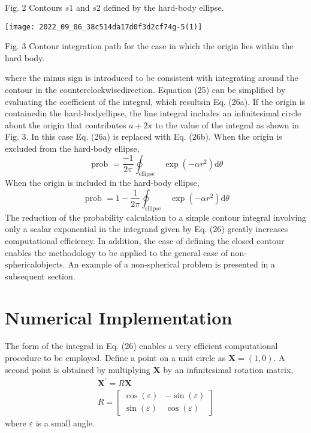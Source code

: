 \documentclass[10pt]{article}
\begin{document}
Fig. 2 Contours $s 1$ and $s 2$ defined by the hard-body ellipse.

\texttt{[image: 2022\_09\_06\_38c514da17d0f3d2cf74g-5(1)]}

Fig. 3 Contour integration path for the case in which the origin lies within the hard body.

where the minus sign is introduced to be consistent with integrating around the contour in the counterclockwisedirection. Equation (25) can be simplified by evaluating the coefficient of the integral, which resultsin Eq. (26a). If the origin is containedin the hard-bodyellipse, the line integral includes an infinitesimal circle about the origin that contributes $a+2 \pi$ to the value of the integral as shown in Fig. 3. In this case Eq. (26a) is replaced with Eq. (26b). When the origin is excluded from the hard-body ellipse,
$$
\text { prob }=\frac{-1}{2 \pi} \oint_{\text {ellipse }} \exp \left(-\alpha r^{2}\right) \mathrm{d} \theta
$$
When the origin is included in the hard-body ellipse,
$$
\text { prob }=1-\frac{1}{2 \pi} \oint_{\text {ellipse }} \exp \left(-\alpha r^{2}\right) \mathrm{d} \theta
$$
The reduction of the probability calculation to a simple contour integral involving only a scalar exponential in the integrand given by Eq. (26) greatly increases computational efficiency. In addition, the ease of defining the closed contour enables the methodology to be applied to the general case of non-sphericalobjects. An example of a non-spherical problem is presented in a subsequent section.

\section{Numerical Implementation}
The form of the integral in Eq. (26) enables a very efficient computational procedure to be employed. Define a point on a unit circle as $\boldsymbol{X}=(1,0)$. A second point is obtained by multiplying $\boldsymbol{X}$ by an infinitesimal rotation matrix,
$$
\begin{gathered}
\boldsymbol{X}^{\prime}=R \boldsymbol{X} \\
R=\left[\begin{array}{cc}
\cos (\varepsilon) & -\sin (\varepsilon) \\
\sin (\varepsilon) & \cos (\varepsilon)
\end{array}\right]
\end{gathered}
$$
where $\varepsilon$ is a small angle.
\end{document}
